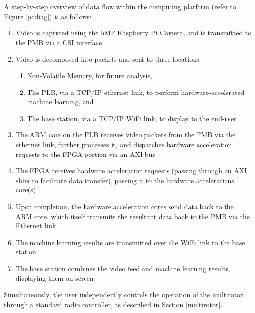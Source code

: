 A step-by-step overview of data flow within the computing platform (refer to Figure \ref{pcdiag}) is as follows:
\begin{enumerate}
\item Video is captured using the 5MP Raspberry Pi Camera, and is transmitted to the PMB via a CSI interface
\item Video is decomposed into packets and sent to three locations:
\begin{enumerate}
\item Non-Volatile Memory, for future analysis, 
\item The PLB, via a TCP/IP ethernet link, to perform hardware-accelerated machine learning, and
\item The base station, via a TCP/IP WiFi link, to display to the end-user
\end{enumerate}
\item The ARM core on the PLB receives video packets from the PMB via the ethernet link, further processes it, and dispatches hardware acceleration requests to the FPGA portion via an AXI bus
\item The FPGA receives hardware acceleration requests (passing through an AXI shim to facilitate data transfer), passing it to the hardware accelerations core(s)
\item Upon completion, the hardware acceleration cores send data back to the ARM core, which itself transmits the resultant data back to the PMB via the Ethernet link
\item The machine learning results are transmitted over the WiFi link to the base station
\item The base station combines the video feed and machine learning results, displaying them on-screen
\end{enumerate}

Simultaneously, the user independently controls the operation of the multirotor through a standard radio controller, as described in Section \ref{multirotor}.
